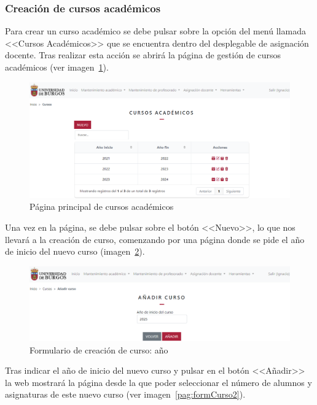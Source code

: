 \subsubsection{Creación de cursos académicos}\label{section:crearCurso}
Para crear un curso académico se debe pulsar sobre la opción del menú llamada <<Cursos Académicos>> que se encuentra dentro del desplegable de asignación docente.
Tras realizar esta acción se abrirá la página de gestión de cursos académicos (ver imagen~\ref{pag:cursos}).

\begin{figure}
	\centering
	\includegraphics[width=\textwidth]{../img/Anexos/Manual usuario/cursos.png}
	\caption{Página principal de cursos académicos}\label{pag:cursos}
\end{figure}

Una vez en la página, se debe pulsar sobre el botón <<Nuevo>>, lo que nos llevará a la creación de curso, comenzando por una página donde se pide el año de inicio del nuevo curso (imagen~\ref{pag:formCurso1}).

\begin{figure}
	\centering
	\includegraphics[width=\textwidth]{../img/Anexos/Manual usuario/formCurso1.png}
	\caption{Formulario de creación de curso: año}\label{pag:formCurso1}
\end{figure}

Tras indicar el año de inicio del nuevo curso y pulsar en el botón <<Añadir>> la web mostrará la página desde la que poder seleccionar el número de alumnos y asignaturas de este nuevo curso (ver imagen~\ref{pag:formCurso2}).


